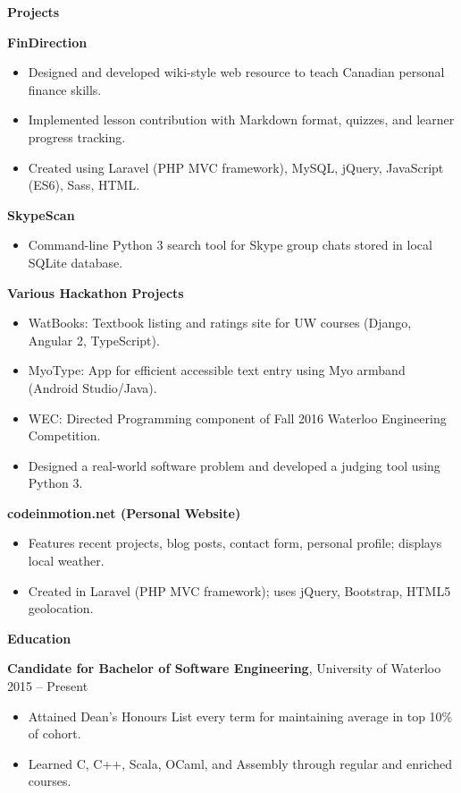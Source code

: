 \documentclass[]{article}
\begin{document}
\textbf{Projects}

\textbf{FinDirection}

\begin{itemize}
\item
  Designed and developed wiki-style web resource to teach Canadian
  personal finance skills.
\item
  Implemented lesson contribution with Markdown format, quizzes, and
  learner progress tracking.
\item
  Created using Laravel (PHP MVC framework), MySQL, jQuery, JavaScript
  (ES6), Sass, HTML.
\end{itemize}

\textbf{SkypeScan}

\begin{itemize}
\item
  Command-line Python 3 search tool for Skype group chats stored in
  local SQLite database.
\end{itemize}

\textbf{Various Hackathon Projects}

\begin{itemize}
\item
  WatBooks: Textbook listing and ratings site for UW courses (Django,
  Angular 2, TypeScript).
\item
  MyoType: App for efficient accessible text entry using Myo armband
  (Android Studio/Java).
\item
  WEC: Directed Programming component of Fall 2016 Waterloo Engineering
  Competition.
\end{itemize}

\begin{itemize}
\item
  Designed a real-world software problem and developed a judging tool
  using Python 3.
\end{itemize}

\textbf{codeinmotion.net (Personal Website)}

\begin{itemize}
\item
  Features recent projects, blog posts, contact form, personal profile;
  displays local weather.
\item
  Created in Laravel (PHP MVC framework); uses jQuery, Bootstrap, HTML5
  geolocation.
\end{itemize}

\textbf{Education}

\textbf{Candidate for Bachelor of Software Engineering}, University of
Waterloo 2015 -- Present

\begin{itemize}
\item
  Attained Dean's Honours List every term for maintaining average in top
  10\% of cohort.
\item
  Learned C, C++, Scala, OCaml, and Assembly through regular and
  enriched courses.
\end{itemize}
\end{document}
